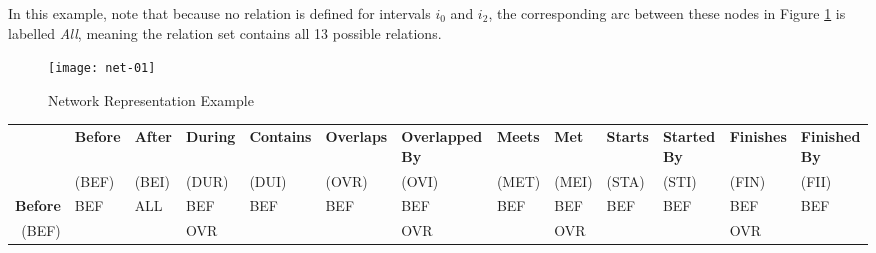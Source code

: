 \documentclass[11pt]{report}
\newenvironment{vvarmargin}[2]
{
  \begin{list}{}
  {
    \setlength{\topsep}{0pt}
    \setlength{\leftmargin}{0pt}
    \setlength{\rightmargin}{0pt}
    \setlength{\listparindent}{\parindent}
    \setlength{\itemindent}{\parindent}
    \setlength{\parsep}{0pt plus 1pt}
    \addtolength{\leftmargin}{#1}\addtolength{\rightmargin}{#2}
  }
  \item
}
{
  \end{list}
}
\begin{document}
          In this example, note that because no relation is defined for intervals
          ${i_0}$ and ${i_2}$, the corresponding arc between these nodes in Figure
          \ref{fig-net-ex-01} is labelled {\em All}, meaning the relation set contains
          all 13 possible relations.

          \begin{figure}[tbhp]
            \begin{center}
              \texttt{[image: net-01]}
              \caption{Network Representation Example}
              \label{fig-net-ex-01}
            \end{center}
          \end{figure}

        \begin{table}[p]
          \begin{vvarmargin}{-4cm}{-4cm}
            \begin{center}
              \tiny
              \begin{tabular}[t]{|r|l|l|l|l|l|l|l|l|l|l|l|l|}
                \hline
                                        & \textbf{Before}         & \textbf{After}          & \textbf{During}         & \textbf{Contains}       & \textbf{Overlaps}       & \textbf{Overlapped By}  & \textbf{Meets}          & \textbf{Met}            & \textbf{Starts}         & \textbf{Started By}     & \textbf{Finishes}       & \textbf{Finished By}    \\
                                        & (BEF)                   & (BEI)                   & (DUR)                   & (DUI)                   & (OVR)                   & (OVI)                   & (MET)                   & (MEI)                   & (STA)                   & (STI)                   & (FIN)                   & (FII)                   \\
                \hline
                \textbf{Before}         & BEF                     & ALL                     & BEF                     & BEF                     & BEF                     & BEF                     & BEF                     & BEF                     & BEF                     & BEF                     & BEF                     & BEF                     \\
                (BEF)                   &                         &                         & OVR                     &                         &                         & OVR                     &                         & OVR                     &                         &                         & OVR                     &                         \\

\end{tabular}
\end{center}
\end{vvarmargin}
\end{table}
\end{document}
